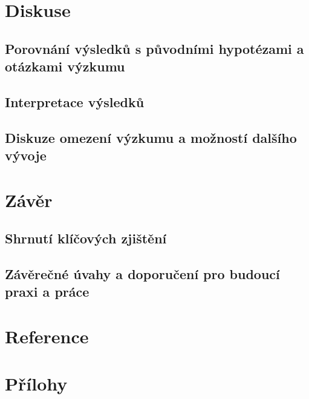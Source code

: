 \documentclass[FM,Proj]{tulthesis}
\begin{document}
\chapter{Diskuse}
\section{Porovnání výsledků s původními hypotézami a otázkami výzkumu}
\section{Interpretace výsledků}
\section{Diskuze omezení výzkumu a možností dalšího vývoje}

\chapter{Závěr}
\section{Shrnutí klíčových zjištění}
\section{Závěrečné úvahy a doporučení pro budoucí praxi a práce}

\chapter{Reference}
\printbibliography[heading=none]

\chapter{Přílohy}
\end{document}

